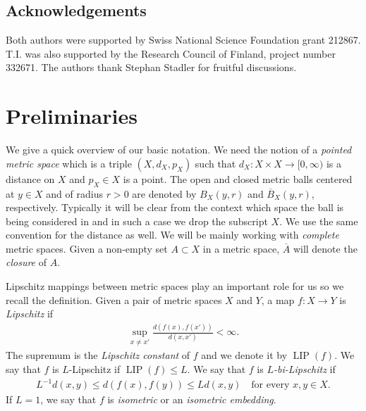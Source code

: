 \documentclass[a4paper,leqno]{amsart}
\numberwithin{equation}{section}
\theoremstyle{remark}
\theoremstyle{remark}
\DeclareMathOperator{\LIP}{LIP}
\begin{document}
\subsection{Acknowledgements}
Both authors were supported by Swiss National Science Foundation grant 212867. T.I. was also supported by the Research Council of Finland, project number 332671. The authors thank Stephan Stadler for fruitful discussions.

\section{Preliminaries}\label{section-preliminaries}
We give a quick overview of our basic notation. We need the notion of a \emph{pointed metric space} which is a triple $( X, d_X, p_X )$ such that $d_X \colon X \times X \rightarrow [0,\infty)$ is a distance on $X$ and $p_X \in X$ is a point. The open and closed metric balls centered at $y \in X$ and of radius $r > 0$ are denoted by $B_X( y, r )$ and $\overline{B}_X( y, r )$, respectively. Typically it will be clear from the context which space the ball is being considered in and in such a case we drop the subscript $X$. We use the same convention for the distance as well. We will be mainly working with \emph{complete} metric spaces. Given a non-empty set $A \subset X$ in a metric space, $\overline{A}$ will denote the \emph{closure} of $A$.

Lipschitz mappings between metric spaces play an important role for us so we recall the definition. Given a pair of metric spaces $X$ and $Y$, a map $f \colon X \rightarrow Y$ is \emph{Lipschitz} if
\begin{align*}
    \sup_{ x \neq x' } \frac{ d(f(x),f(x')) }{ d(x,x') } < \infty.
\end{align*}
The supremum is the \emph{Lipschitz constant} of $f$ and we denote it by $\LIP(f)$. We say that $f$ is $L$-Lipschitz if $\LIP(f) \leq L$. We say that $f$ is \emph{$L$-bi-Lipschitz} if
\begin{align*}
    L^{-1} d(x,y) \leq d(f(x),f(y)) \leq Ld(x,y)
    \quad\text{for every $x, y \in X$.}
\end{align*}
If $L = 1$, we say that $f$ is \emph{isometric} or an \emph{isometric embedding}.
\end{document}
